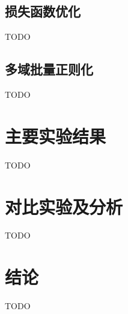 \subsection{损失函数优化}
TODO
\subsection{多域批量正则化}
TODO

\section{主要实验结果}
TODO

\section{对比实验及分析}
TODO

\section{结论}
TODO

